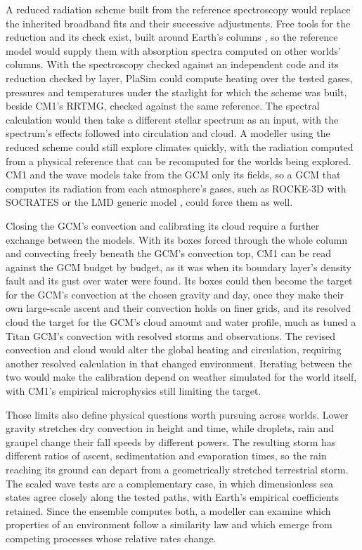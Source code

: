 A reduced radiation scheme built from the reference spectroscopy would replace the inherited broadband fits and their successive adjustments. Free tools for the reduction and its check exist, built around
Earth's columns \autocite{hogan2022tool,hogan2020evaluating}, so the reference model would supply them with
absorption spectra computed on other worlds' columns. With the spectroscopy checked against an independent code
and its reduction checked by layer, PlaSim could compute heating over the tested
gases, pressures and temperatures under the starlight for which the scheme was built, beside CM1's RRTMG, checked
against the same reference. The spectral calculation would then take a different stellar spectrum as an input, with the spectrum's effects followed into circulation and cloud. A modeller using the reduced scheme could still explore climates quickly, with the radiation computed from a physical reference that can be recomputed for the worlds being explored. CM1 and the wave models take from the GCM only its fields, so a GCM that computes its radiation from each atmosphere's gases, such as ROCKE-3D with SOCRATES or the LMD generic model \autocite{tsigaridis2025rocke3d,wordsworth2011gliese}, could force them as well.

Closing the GCM's convection and calibrating its cloud require a further exchange between the models. With its
boxes forced through the whole column and convecting freely beneath the GCM's convection top, CM1 can be read
against the GCM budget by budget, as it was when its boundary layer's density fault and its gust over water were found. Its
boxes could then become the target for the GCM's convection at the chosen gravity and day, once they make their own
large-scale ascent and their convection holds on finer grids, and its resolved cloud the target for the GCM's cloud
amount and water profile, much as \textcite{battalio2022interaction} tuned a Titan GCM's convection with
resolved storms \autocite{rafkin2022interaction} and observations. The revised convection and cloud would alter the
global heating and circulation, requiring another resolved calculation in that changed environment. Iterating
between the two would make the calibration depend on weather simulated for the world itself, with CM1's empirical
microphysics still limiting the target.

Those limits also define physical questions worth pursuing across worlds. Lower gravity stretches
dry convection in height and time, while droplets, rain and graupel change their fall speeds by different
powers. The resulting storm has different ratios of ascent, sedimentation and evaporation times, so the
rain reaching its ground can depart from a geometrically stretched terrestrial storm. The scaled wave tests are a complementary case, in which dimensionless sea states agree closely along the tested paths,
with Earth's empirical coefficients retained. Since the ensemble computes both, a modeller can examine which properties of an environment follow a similarity law and which emerge from competing processes whose
relative rates change.

